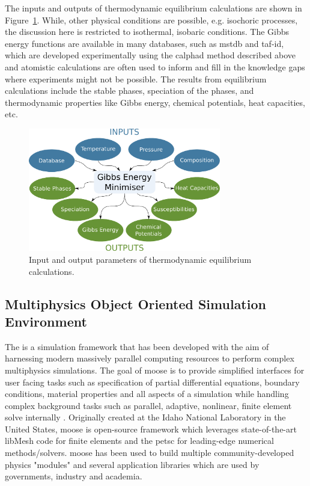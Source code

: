 	The inputs and outputs of thermodynamic equilibrium calculations are shown in Figure~\ref{fig:Thermod}. While, other physical conditions are possible, e.g. isochoric processes, the discussion here is restricted to isothermal, isobaric conditions. The Gibbs energy functions are available in many databases, such as \gls{mstdb} and \gls{taf-id}, which are developed experimentally using the \gls{calphad} method described above and atomistic calculations are often used to inform and fill in the knowledge gaps where experiments might not be possible. The results from equilibrium calculations include the stable phases, speciation of the phases, and thermodynamic properties like Gibbs energy, chemical potentials, heat capacities, etc.
	\begin{figure}[ht]
        		\centering
        		\includegraphics[width=0.75\textwidth]{figures/chapter-1/thermodynamics.pdf}
        		\caption{Input and output parameters of thermodynamic equilibrium calculations.}
        		\label{fig:Thermod}
    	\end{figure}
	
\subsection{Multiphysics Object Oriented Simulation Environment}
	The  is a simulation framework that has been developed with the aim of harnessing modern massively parallel computing resources to perform complex multiphysics simulations. The goal of \gls{moose} is to provide simplified interfaces for user facing tasks such as specification of partial differential equations, boundary conditions, material properties and all aspects of a simulation while handling complex background tasks such as parallel, adaptive, nonlinear, finite element solve internally \cite{Permann:2020aa}. Originally created at the Idaho National Laboratory in the United States, \gls{moose} is open-source framework which leverages state-of-the-art libMesh code \cite{Kirk:2006aa} for finite elements and the \gls{petsc} \cite{Balay:2022ab,Balay:2022aa} for leading-edge numerical methods/solvers. \gls{moose} has been used to build multiple community-developed physics "modules" \cite{Guillaume:2021aa,Guillaume:2021ab,Adhikary:2016aa,Wilkins:2020aa,Shemon:2021aa} and several application libraries which are used by governments, industry and academia. 
	
